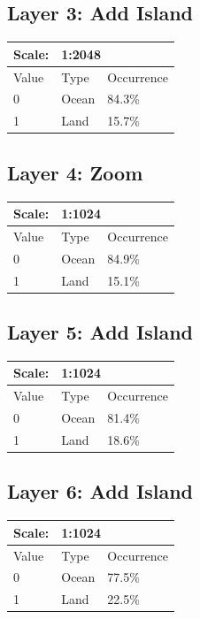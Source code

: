 \documentclass{article}
\begin{document}
	\subsection{Layer 3: Add Island}
	\begin{tabular}{|l|l|l|}\hline
		Scale: & \multicolumn{2}{|l|}{1:2048} \\\hline\hline
		Value  & Type   & Occurrence \\\hline
		0      & Ocean  & 84.3\%\\\hline
		1      & Land   & 15.7\%\\\hline
	\end{tabular}

	\subsection{Layer 4: Zoom}
	\begin{tabular}{|l|l|l|}\hline
		Scale: & \multicolumn{2}{|l|}{1:1024} \\\hline\hline
		Value  & Type   & Occurrence \\\hline
		0      & Ocean  & 84.9\%\\\hline
		1      & Land   & 15.1\%\\\hline
	\end{tabular}

	\subsection{Layer 5: Add Island}
	\begin{tabular}{|l|l|l|}\hline
		Scale: & \multicolumn{2}{|l|}{1:1024} \\\hline\hline
		Value  & Type   & Occurrence \\\hline
		0      & Ocean  & 81.4\%\\\hline
		1      & Land   & 18.6\%\\\hline
	\end{tabular}

	\subsection{Layer 6: Add Island}
	\begin{tabular}{|l|l|l|}\hline
		Scale: & \multicolumn{2}{|l|}{1:1024} \\\hline\hline
		Value  & Type   & Occurrence \\\hline
		0      & Ocean  & 77.5\%\\\hline
		1      & Land   & 22.5\%\\\hline
	\end{tabular}
\end{document}
